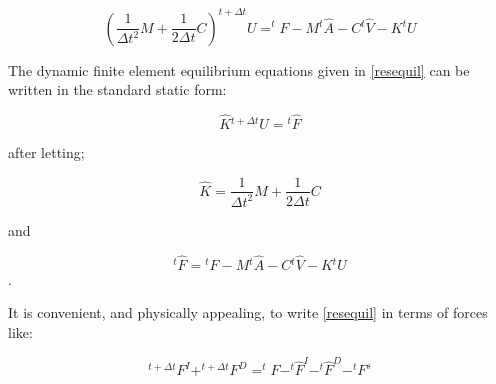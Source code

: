 \documentclass[12pt,letterpaper]{article}
\begin{document}
\begin{equation}
\left(\dfrac{1}{\Delta t^2}M+\dfrac{1}{2\Delta t}C\right) ^{t+\Delta t}U=^{t}F-M{}^t\hat A - C{}^t\hat V - K{}^tU
\label{resequil}
\end{equation}

The dynamic finite element equilibrium equations given in \cref{resequil} can be written in the standard static form:

\[\hat K{}^{t + \Delta t}U = {}^t\hat F\]

after letting;

\[\hat K = \frac{1}{{\Delta {t^2}}}M + \frac{1}{{2\Delta t}}C\]

and

\[{}^t\hat F = {}^tF - M{}^t\hat A - C{}^t\hat V - K{}^tU\].




It is convenient, and physically appealing, to write \cref{resequil} in terms of forces like:


\begin{equation}
^{t+\Delta t}F^I+^{t+\Delta t}F^D=^{t}F-^t\hat {F}^I-^t\hat {F}^D-^{t}F^s
\label{force equil 2}
\end{equation}
\end{document}
